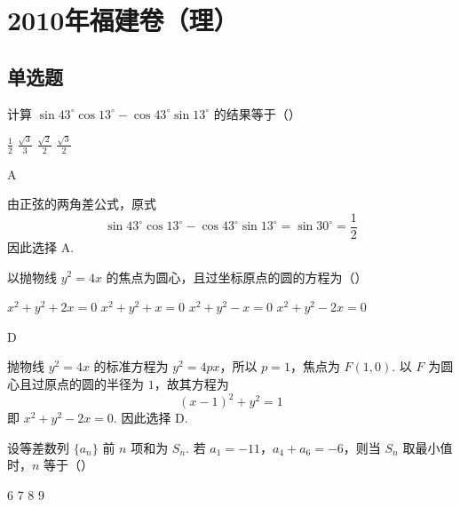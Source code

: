 
\chapter{2010年福建卷（理）}

\section{单选题}

\begin{problem}
计算 \(\sin 43^{\circ} \cos 13^{\circ} - \cos 43^{\circ} \sin 13^{\circ}\) 的结果等于（\quad）

\choices
    {\(\frac{1}{2}\)}
    {\( \frac{\sqrt{3}}{3} \)}
    {\( \frac{\sqrt{2}}{2} \)}
    {\(\frac{\sqrt{3}}{2}\)}
\end{problem}

\begin{answer}
A
\end{answer}

\begin{solution}
由正弦的两角差公式，原式
\[
\sin 43^{\circ}\cos 13^{\circ}-\cos 43^{\circ}\sin 13^{\circ}=\sin 30^{\circ}=\frac{1}{2}
\]
因此选择 A.
\end{solution}

\begin{problem}
以抛物线 \( y^{2} = 4x \) 的焦点为圆心，且过坐标原点的圆的方程为（\quad）

\choices
    {\(x^{2} + y^{2} + 2x = 0\)}
    {\(x^{2} + y^{2} + x = 0\)}
    {\(x^{2} + y^{2} - x = 0\)}
    {\(x^{2} + y^{2} - 2x = 0\)}
\end{problem}

\begin{answer}
D
\end{answer}

\begin{solution}
抛物线 \(y^{2}=4x\) 的标准方程为 \(y^{2}=4px\)，所以 \(p=1\)，焦点为 \(F(1,0)\). 以 \(F\) 为圆心且过原点的圆的半径为 \(1\)，故其方程为
\[
(x-1)^{2}+y^{2}=1
\]
即 \(x^{2}+y^{2}-2x=0\). 因此选择 D.
\end{solution}

\begin{problem}
设等差数列 \(\{a_n\}\) 前 \(n\) 项和为 \(S_n\). 若 \(a_1 = -11\)，\(a_4 + a_6 = -6\)，则当 \(S_n\) 取最小值时，\(n\) 等于（\quad）

\choices
    {6}
    {7}
    {8}
    {9}
\end{problem}

